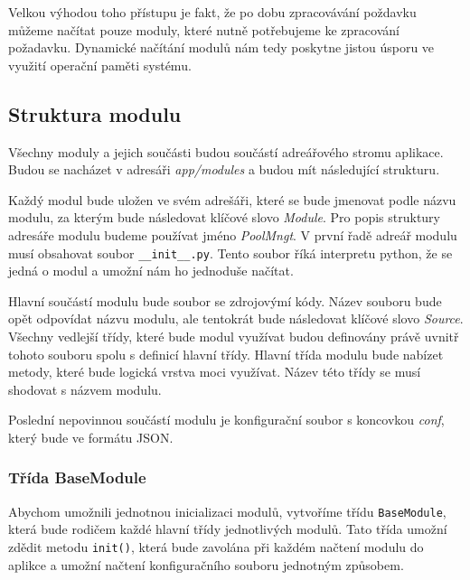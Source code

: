     Velkou výhodou toho přístupu je fakt, že po dobu zpracovávání poždavku můžeme načítat pouze moduly, které nutně potřebujeme ke zpracování požadavku. Dynamické načítání modulů nám tedy poskytne jistou úsporu ve využití operační paměti systému.
    \subsection{Struktura modulu}
    \label{package}
    Všechny moduly a jejich součásti budou součástí adreářového stromu aplikace. Budou se nacházet v adresáři \emph{app/modules} a budou mít následující strukturu.  
    \begin{figure}
      \centering
    \end{figure}  
    


    Každý modul bude uložen ve svém adrešáři, které se bude jmenovat podle názvu modulu, za kterým bude následovat klíčové slovo \emph{Module}. Pro popis struktury adresáře modulu budeme používat jméno \emph{PoolMngt}. V první řadě adreář modulu musí obsahovat soubor \verb|__init__.py|. Tento soubor říká interpretu python, že se jedná o modul a umožní nám ho jednoduše načítat.

    Hlavní součástí modulu bude soubor se zdrojovýmí kódy. Název souboru bude opět odpovídat názvu modulu, ale tentokrát bude následovat klíčové slovo \emph{Source}.
    Všechny vedlejší třídy, které bude modul využívat budou definovány právě uvnitř tohoto souboru spolu s definicí hlavní třídy. Hlavní třída modulu bude nabízet metody, které bude logická vrstva moci využívat. Název této třídy se musí shodovat s názvem modulu.

    Poslední nepovinnou součástí modulu je konfigurační soubor s koncovkou \emph{conf}, který bude ve formátu JSON.

    \subsubsection{Třída BaseModule}
    Abychom umožnili jednotnou inicializaci modulů, vytvoříme třídu \verb|BaseModule|, která bude rodičem každé hlavní třídy jednotlivých modulů. Tato třída umožní zdědit metodu \verb|init()|, která bude zavolána při každém načtení modulu do aplikce a umožní načtení konfiguračního souboru jednotným způsobem.

